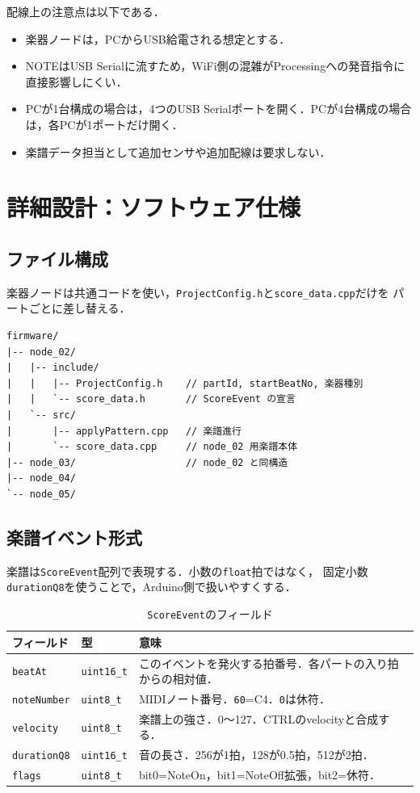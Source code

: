\documentclass[uplatex,dvipdfmx]{jlreq}
\newcommand{\code}[1]{\texttt{#1}}
\begin{document}
配線上の注意点は以下である．
\begin{itemize}
  \item 楽器ノードは，PCからUSB給電される想定とする．
  \item NOTEはUSB Serialに流すため，WiFi側の混雑がProcessingへの発音指令に直接影響しにくい．
  \item PCが1台構成の場合は，4つのUSB Serialポートを開く．PCが4台構成の場合は，各PCが1ポートだけ開く．
  \item 楽譜データ担当として追加センサや追加配線は要求しない．
\end{itemize}

\section{詳細設計：ソフトウェア仕様}

\subsection{ファイル構成}

楽器ノードは共通コードを使い，\code{ProjectConfig.h}と\code{score\_data.cpp}だけを
パートごとに差し替える．

\begin{verbatim}
firmware/
|-- node_02/
|   |-- include/
|   |   |-- ProjectConfig.h    // partId, startBeatNo, 楽器種別
|   |   `-- score_data.h       // ScoreEvent の宣言
|   `-- src/
|       |-- applyPattern.cpp   // 楽譜進行
|       `-- score_data.cpp     // node_02 用楽譜本体
|-- node_03/                   // node_02 と同構造
|-- node_04/
`-- node_05/
\end{verbatim}

\subsection{楽譜イベント形式}

楽譜は\code{ScoreEvent}配列で表現する．小数の\code{float}拍ではなく，
固定小数\code{durationQ8}を使うことで，Arduino側で扱いやすくする．

\begin{table}[h]
\centering
\caption{\code{ScoreEvent}のフィールド}
\label{tab:scoreevent}
\begin{tabular}{p{}p{}p{}}
\toprule
\textbf{フィールド} & \textbf{型} & \textbf{意味} \\
\midrule
\code{beatAt} & \code{uint16\_t} & このイベントを発火する拍番号．各パートの入り拍からの相対値．\\
\code{noteNumber} & \code{uint8\_t} & MIDIノート番号．\code{60}=C4．\code{0}は休符．\\
\code{velocity} & \code{uint8\_t} & 楽譜上の強さ．0〜127．CTRLのvelocityと合成する．\\
\code{durationQ8} & \code{uint16\_t} & 音の長さ．256が1拍，128が0.5拍，512が2拍．\\
\code{flags} & \code{uint8\_t} & bit0=NoteOn，bit1=NoteOff拡張，bit2=休符．\\
\bottomrule
\end{tabular}
\end{table}
\end{document}
